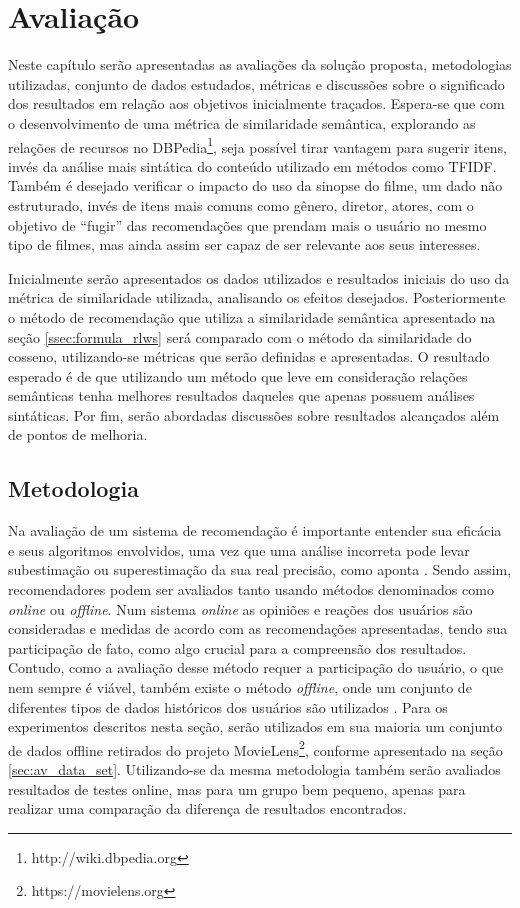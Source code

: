 \chapter{Avaliação}
\label{cap:evaluation}

Neste capítulo serão apresentadas as avaliações da solução proposta, metodologias utilizadas, conjunto de dados estudados, métricas e discussões sobre o significado dos resultados em relação aos objetivos inicialmente traçados. Espera-se que com o desenvolvimento de uma métrica de similaridade semântica, explorando as relações de recursos no DBPedia\footnote{http://wiki.dbpedia.org}, seja possível tirar vantagem para sugerir itens, invés da análise mais sintática do conteúdo utilizado em métodos como \ac{TFIDF}. Também é desejado verificar o impacto do uso da sinopse do filme, um dado não estruturado, invés de itens mais comuns como gênero, diretor, atores, com o objetivo de \enquote{fugir} das recomendações que prendam mais o usuário no mesmo tipo de filmes, mas ainda assim ser capaz de ser relevante aos seus interesses.

Inicialmente serão apresentados os dados utilizados e resultados iniciais do uso da métrica de similaridade utilizada, analisando os efeitos desejados. Posteriormente o método de recomendação que utiliza a similaridade semântica apresentado na seção \ref{ssec:formula_rlws} será comparado com o método da similaridade do cosseno, utilizando-se métricas que serão definidas e apresentadas. O resultado esperado é de que utilizando um método que leve em consideração relações semânticas tenha melhores resultados daqueles que apenas possuem análises sintáticas. Por fim, serão abordadas discussões sobre resultados alcançados além de pontos de melhoria.

\section{Metodologia}
\label{sec:methodology}

Na avaliação de um sistema de recomendação é importante entender sua eficácia e seus algoritmos envolvidos, uma vez que uma análise incorreta pode levar subestimação ou superestimação da sua real precisão, como aponta \cite{Aggarwal2016:Evaluation}. Sendo assim, recomendadores podem ser avaliados tanto usando métodos denominados como \textit{online} ou \textit{offline}. Num sistema \textit{online} as opiniões e reações dos usuários são consideradas e medidas de acordo com as recomendações apresentadas, tendo sua participação de fato, como algo crucial para a compreensão dos resultados. Contudo, como a avaliação desse método requer a participação do usuário, o que nem sempre é viável, também existe o método \textit{offline}, onde um conjunto de diferentes tipos de dados históricos dos usuários são utilizados \citep{Herlocker:1999}. Para os experimentos descritos nesta seção, serão utilizados em sua maioria um conjunto de dados offline retirados do projeto MovieLens\footnote{https://movielens.org}, conforme apresentado na seção \ref{sec:av_data_set}. Utilizando-se da mesma metodologia também serão avaliados resultados de testes online, mas para um grupo bem pequeno, apenas para realizar uma comparação da diferença de resultados encontrados.

